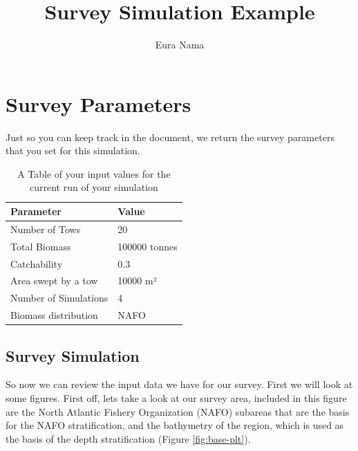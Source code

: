 \documentclass[
]{article}
\title{Survey Simulation Example}
\author{Eura Nama}
\date{}
\begin{document}
\maketitle

\hypertarget{survey-parameters}{%
\section{Survey Parameters}\label{survey-parameters}}

Just so you can keep track in the document, we return the survey parameters that you set for this simulation.

\begin{table}

\caption{\label{tab:paras}A Table of your input values for the current run of your simulation}
\centering
\begin{tabular}[t]{ll}
\toprule
Parameter & Value\\
\midrule
Number of Tows & 20\\
Total Biomass & 100000 tonnes\\
Catchability & 0.3\\
Area swept by a tow & 10000 m²\\
Number of Simulations & 4\\
\addlinespace
Biomass distribution & NAFO\\
\bottomrule
\end{tabular}
\end{table}

\hypertarget{survey-simulation}{%
\subsection{Survey Simulation}\label{survey-simulation}}

So now we can review the input data we have for our survey. First we will look at some figures. First off, lets take a look at our survey area, included in this figure are the North Atlantic Fishery Organization (NAFO) subareas that are the basis for the NAFO stratification, and the bathymetry of the region, which is used as the basis of the depth stratification (Figure \ref{fig:base-plt}).
\end{document}
